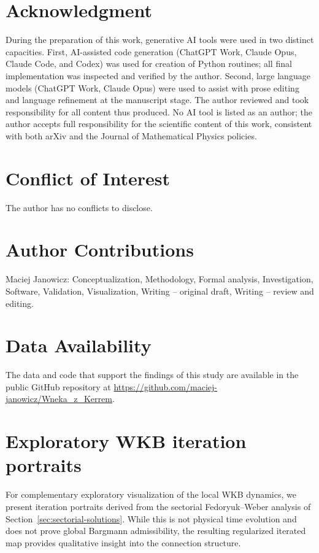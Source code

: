 \documentclass[11pt]{article}
\theoremstyle{remark}
\begin{document}
\clearpage
\section*{Acknowledgment}

During the preparation of this work, generative AI tools were used
in two distinct capacities. First, AI-assisted code generation
(ChatGPT Work, Claude Opus, Claude Code, and Codex) was used for creation
of Python routines; all final implementation was inspected and verified
by the author. Second, large language models (ChatGPT Work, Claude Opus)
were used to assist with prose editing and language refinement at the
manuscript stage. The author reviewed and took responsibility for all
content thus produced. No AI tool is listed as an author; the author
accepts full responsibility for the scientific content of this work,
consistent with both arXiv and the Journal of Mathematical Physics
policies.

\section*{Conflict of Interest}

The author has no conflicts to disclose.

\section*{Author Contributions}

Maciej Janowicz: Conceptualization, Methodology, Formal analysis,
Investigation, Software, Validation, Visualization, Writing -- original
draft, Writing -- review and editing.

\section*{Data Availability}

The data and code that support the findings of this study are available in
the public GitHub repository at
\url{https://github.com/maciej-janowicz/Wneka_z_Kerrem}\cite{Janowicz2026KerrRepository}.


\appendix
\renewcommand{\theequation}{\Alph{section}\arabic{equation}}
\setcounter{equation}{0}
\section{Exploratory WKB iteration portraits}
\label{app:wkb-portraits}

For complementary exploratory visualization of the local WKB dynamics,
we present iteration portraits derived from the sectorial Fedoryuk--Weber
analysis of Section~\ref{sec:sectorial-solutions}. While this is not physical
time evolution and does not prove global Bargmann admissibility, the
resulting regularized iterated map provides qualitative insight into the
connection structure.
\end{document}
